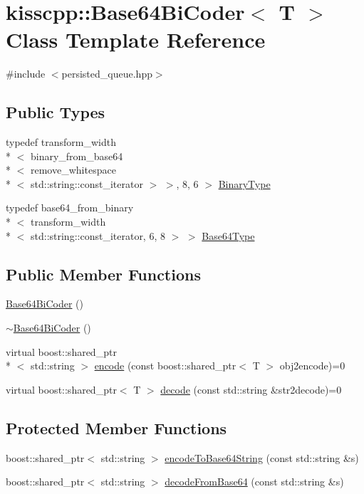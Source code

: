 \hypertarget{a00019}{\section{kisscpp\-:\-:Base64\-Bi\-Coder$<$ T $>$ Class Template Reference}
\label{a00019}
}


{\ttfamily \#include $<$persisted\-\_\-queue.\-hpp$>$}

\subsection*{Public Types}
\begin{DoxyCompactItemize}
\item 
typedef transform\-\_\-width\\*
$<$ binary\-\_\-from\-\_\-base64\\*
$<$ remove\-\_\-whitespace\\*
$<$ std\-::string\-::const\-\_\-iterator $>$ $>$, 8, 6 $>$ \hyperlink{a00019_a3d4011fcafbdf230c7cc8188714ed499}{Binary\-Type}
\item 
typedef base64\-\_\-from\-\_\-binary\\*
$<$ transform\-\_\-width\\*
$<$ std\-::string\-::const\-\_\-iterator, 6, 8 $>$ $>$ \hyperlink{a00019_a54d2f4ba00e068e8d4d6fd6497ebf21d}{Base64\-Type}
\end{DoxyCompactItemize}
\subsection*{Public Member Functions}
\begin{DoxyCompactItemize}
\item 
\hyperlink{a00019_a64d95b2904f11acbddf6d70f19e61b35}{Base64\-Bi\-Coder} ()
\item 
\hyperlink{a00019_a203c4896daf408dfb45c9d57aea0d959}{$\sim$\-Base64\-Bi\-Coder} ()
\item 
virtual boost\-::shared\-\_\-ptr\\*
$<$ std\-::string $>$ \hyperlink{a00019_ade4ace8899f97568458a62df0222b32c}{encode} (const boost\-::shared\-\_\-ptr$<$ T $>$ obj2encode)=0
\item 
virtual boost\-::shared\-\_\-ptr$<$ T $>$ \hyperlink{a00019_a8b3f9d0c6d4d88dded790f7627d0a3ea}{decode} (const std\-::string \&str2decode)=0
\end{DoxyCompactItemize}
\subsection*{Protected Member Functions}
\begin{DoxyCompactItemize}
\item 
boost\-::shared\-\_\-ptr$<$ std\-::string $>$ \hyperlink{a00019_ab17cf7f1594fa761eca93d6a1ee614ef}{encode\-To\-Base64\-String} (const std\-::string \&s)
\item 
boost\-::shared\-\_\-ptr$<$ std\-::string $>$ \hyperlink{a00019_af8b91f925c229a0892be4e5d9428fb13}{decode\-From\-Base64} (const std\-::string \&s)
\end{DoxyCompactItemize}


